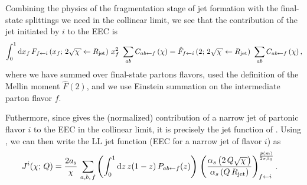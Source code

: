 

Combining the physics of the fragmentation stage of jet formation with the final-state splittings we need in the collinear limit, we see that the contribution of the jet initiated by \(i\) to the EEC is
\begin{align}
    \label{eq:jet_fn_ll_0}
    \int_0^1
    \dd x_f
    \,
    F_{f \leftarrow i}\le(x_f;\,
    2 \sqrt{\chi}\leftarrow \Rjet\ri)
    \,
    x_f^2
    \,\,
    \sum_{ab} C_{ab\leftarrow f}\le(\chi\ri)
    =
    \hat{F}_{f \leftarrow i}
    \le(2;\,
    2 \sqrt{\chi}\leftarrow \Rjet\ri)
    \,\,
    \sum_{ab} C_{ab\leftarrow f}\le(\chi\ri)
    ,
\end{align}
%
where we have summed over final-state partons flavors, used the definition of the Mellin moment \(\hat{F}(2)\), and we use Einstein summation on the intermediate parton flavor \(f\).

Futhermore, since  gives the (normalized) contribution of a narrow jet of partonic flavor \(i\) to the EEC in the collinear limit, it is precisely the jet function of .
%
Using , we can then write the LL jet function (EEC for a narrow jet of flavor \(i\)) as
\begin{align}
    \label{eq:eec_jet_fn_ll_1}
    J^i(\chi; \, Q)
    &=
    \frac{2 \as}{\chi}
    \,
    \sum_{a,b,\,f}
    \le(
        \int_0^1 \dd z \, z (1-z) \,
        P_{ab \leftarrow f}(z)
    \ri)
    \,
    \le(
        \frac{\alpha_s\le(2\,Q\sqrt{\chi}\ri)}
        {\alpha_s\le(Q\,\Rjet\ri)}
    \ri)
    ^
    {\frac{\hat{p}(m)}{2\pi\beta_0}}
    _{f\leftarrow i}
    .
\end{align}



